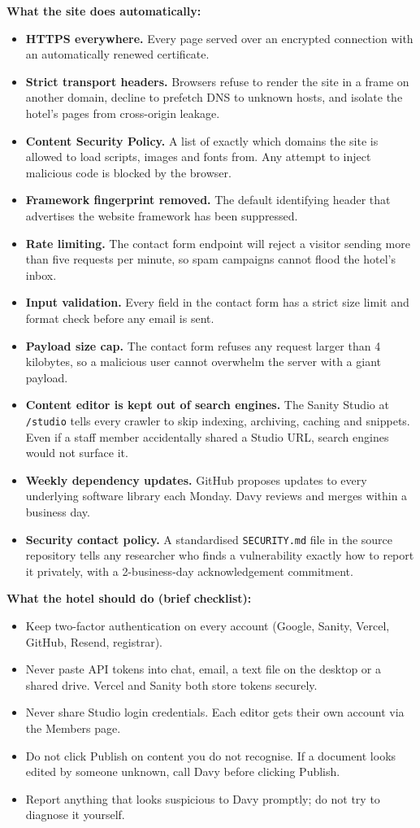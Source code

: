 \documentclass[11pt,a4paper]{article}
\begin{document}
\textbf{What the site does automatically:}
\begin{itemize}
\item \textbf{HTTPS everywhere.} Every page served over an encrypted connection with an automatically renewed certificate.
\item \textbf{Strict transport headers.} Browsers refuse to render the site in a frame on another domain, decline to prefetch DNS to unknown hosts, and isolate the hotel's pages from cross-origin leakage.
\item \textbf{Content Security Policy.} A list of exactly which domains the site is allowed to load scripts, images and fonts from. Any attempt to inject malicious code is blocked by the browser.
\item \textbf{Framework fingerprint removed.} The default identifying header that advertises the website framework has been suppressed.
\item \textbf{Rate limiting.} The contact form endpoint will reject a visitor sending more than five requests per minute, so spam campaigns cannot flood the hotel's inbox.
\item \textbf{Input validation.} Every field in the contact form has a strict size limit and format check before any email is sent.
\item \textbf{Payload size cap.} The contact form refuses any request larger than 4 kilobytes, so a malicious user cannot overwhelm the server with a giant payload.
\item \textbf{Content editor is kept out of search engines.} The Sanity Studio at \texttt{/studio} tells every crawler to skip indexing, archiving, caching and snippets. Even if a staff member accidentally shared a Studio URL, search engines would not surface it.
\item \textbf{Weekly dependency updates.} GitHub proposes updates to every underlying software library each Monday. Davy reviews and merges within a business day.
\item \textbf{Security contact policy.} A standardised \texttt{SECURITY.md} file in the source repository tells any researcher who finds a vulnerability exactly how to report it privately, with a 2-business-day acknowledgement commitment.
\end{itemize}

\textbf{What the hotel should do (brief checklist):}
\begin{itemize}
\item Keep two-factor authentication on every account (Google, Sanity, Vercel, GitHub, Resend, registrar).
\item Never paste API tokens into chat, email, a text file on the desktop or a shared drive. Vercel and Sanity both store tokens securely.
\item Never share Studio login credentials. Each editor gets their own account via the Members page.
\item Do not click Publish on content you do not recognise. If a document looks edited by someone unknown, call Davy before clicking Publish.
\item Report anything that looks suspicious to Davy promptly; do not try to diagnose it yourself.
\end{itemize}
\end{document}
